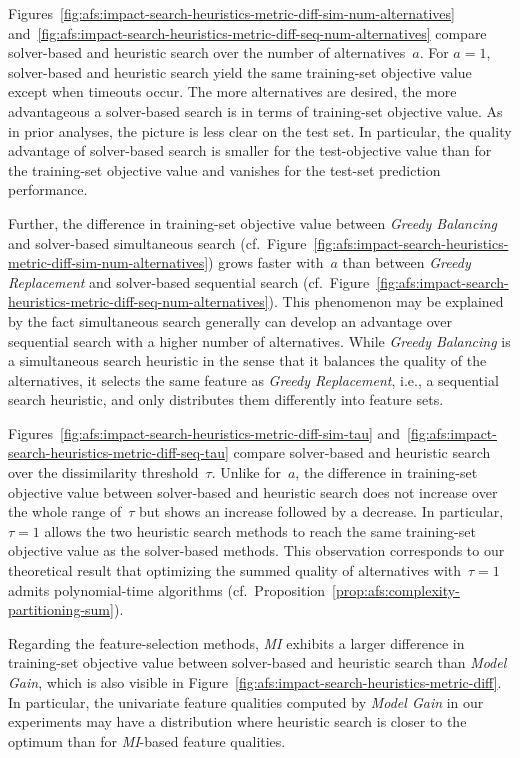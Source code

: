 \documentclass{article}
\theoremstyle{definition}
\begin{document}
Figures~\ref{fig:afs:impact-search-heuristics-metric-diff-sim-num-alternatives} and~\ref{fig:afs:impact-search-heuristics-metric-diff-seq-num-alternatives} compare solver-based and heuristic search over the number of alternatives~$a$.
For $a=1$, solver-based and heuristic search yield the same training-set objective value except when timeouts occur.
The more alternatives are desired, the more advantageous a solver-based search is in terms of training-set objective value.
As in prior analyses, the picture is less clear on the test set.
In particular, the quality advantage of solver-based search is smaller for the test-objective value than for the training-set objective value and vanishes for the test-set prediction performance.

Further, the difference in training-set objective value between \emph{Greedy Balancing} and solver-based simultaneous search (cf.~Figure~\ref{fig:afs:impact-search-heuristics-metric-diff-sim-num-alternatives}) grows faster with~$a$ than between \emph{Greedy Replacement} and solver-based sequential search (cf.~Figure~\ref{fig:afs:impact-search-heuristics-metric-diff-seq-num-alternatives}).
This phenomenon may be explained by the fact simultaneous search generally can develop an advantage over sequential search with a higher number of alternatives.
While \emph{Greedy Balancing} is a simultaneous search heuristic in the sense that it balances the quality of the alternatives, it selects the same feature as \emph{Greedy Replacement}, i.e., a sequential search heuristic, and only distributes them differently into feature sets.

Figures~\ref{fig:afs:impact-search-heuristics-metric-diff-sim-tau} and~\ref{fig:afs:impact-search-heuristics-metric-diff-seq-tau} compare solver-based and heuristic search over the dissimilarity threshold~$\tau$.
Unlike for~$a$, the difference in training-set objective value between solver-based and heuristic search does not increase over the whole range of~$\tau$ but shows an increase followed by a decrease.
In particular, $\tau=1$ allows the two heuristic search methods to reach the same training-set objective value as the solver-based methods.
This observation corresponds to our theoretical result that optimizing the summed quality of alternatives with~$\tau=1$ admits polynomial-time algorithms (cf.~Proposition~\ref{prop:afs:complexity-partitioning-sum}).

Regarding the feature-selection methods, \emph{MI} exhibits a larger difference in training-set objective value between solver-based and heuristic search than \emph{Model Gain}, which is also visible in Figure~\ref{fig:afs:impact-search-heuristics-metric-diff}.
In particular, the univariate feature qualities computed by \emph{Model Gain} in our experiments may have a distribution where heuristic search is closer to the optimum than for \emph{MI}-based feature qualities.
\end{document}
